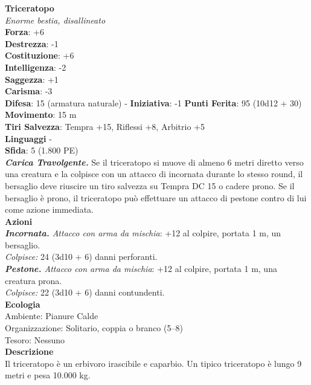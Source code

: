 \begin{multicols}{2}
\medskip\textbf{Triceratopo}\\
\emph{Enorme bestia, disallineato}\\
\textbf{Forza}: +6\\
\textbf{Destrezza}: -1\\
\textbf{Costituzione}: +6\\
\textbf{Intelligenza}: -2\\
\textbf{Saggezza}: +1\\
\textbf{Carisma}: -3\\
\textbf{Difesa}: 15 (armatura naturale) - \textbf{Iniziativa}: -1
\textbf{Punti Ferita}: 95 (10d12 + 30)\\
\textbf{Movimento}: 15 m\\
\textbf{Tiri Salvezza}: Tempra +15, Riflessi +8, Arbitrio +5\\
\textbf{Linguaggi} -\\
\textbf{Sfida}: 5 (1.800 PE)\smallskip\\
\emph{\textbf{Carica Travolgente.}} Se il triceratopo si muove di almeno 6 metri diretto verso una creatura e la colpisce con un attacco di incornata durante lo stesso round, il bersaglio deve riuscire un tiro salvezza su Tempra DC  15 o cadere prono. Se il bersaglio è prono, il triceratopo può effettuare un attacco di pestone contro di lui come azione immediata.\\
\smallskip\textbf{Azioni}\\
\emph{\textbf{Incornata.} Attacco con arma da mischia}: +12 al colpire, portata 1 m, un bersaglio.\\
\emph{Colpisce:} 24 (3d10 + 6) danni perforanti.\\
\emph{\textbf{Pestone.} Attacco con arma da mischia}: +12 al colpire, portata 1 m, una creatura prona.\\
\emph{Colpisce:} 22 (3d10 + 6) danni contundenti.\\
\textbf{Ecologia}\\
Ambiente: Pianure Calde\\
Organizzazione: Solitario, coppia o branco (5–8)\\
Tesoro: Nessuno\\
\textbf{Descrizione}\\
Il triceratopo è un erbivoro irascibile e caparbio. Un tipico triceratopo è lungo 9 metri e pesa 10.000 kg.\\


\end{multicols}

